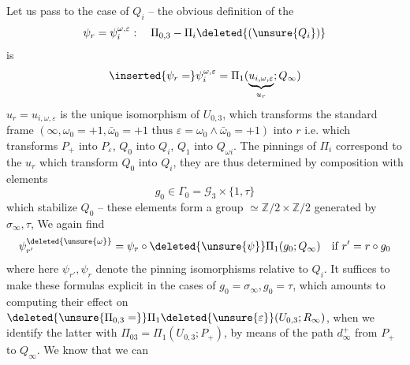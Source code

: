 Let us pass to the case of $Q_i$ -- the obvious  definition of the
\[
\psi_r=\psi_i^{\omega,\varepsilon}:\quad\Pi_{0,3}-\Pi_i\deleted{(\unsure{Q_i})}
\]
is
\[
\inserted{\psi_r=}\psi_i^{\omega,\varepsilon}=\Pi_1(\underbrace{u_{i,\omega,\varepsilon}}_{u_r};Q_\infty)
\]
 $u_r=u_{i,\omega,\varepsilon}$ is the unique isomorphism of $U_{0,3}$,  which transforms the  standard frame $(\infty,\omega_0=+1,\bar\omega_0=+1\text{ thus }\varepsilon=\omega_0\wedge\bar\omega_0=+1)$ into $r$ i.e. which transforms $P_+$ into $P_\varepsilon$, $Q_0$ into $Q_i$, $Q_1$ into $Q_{\omega i}$.  The pinnings   of $\Pi_i$ correspond to the $u_r$ which transform $Q_0$ into $Q_i$, they are thus determined by composition with elements
\[
g_0\in\Gamma_0=\mathcal G_3\times\{1,\tau\}
\]
which stabilize $Q_0$ -- these elements  form a group $\simeq\mathbb Z/2\times\mathbb Z/2$ generated by $\sigma_\infty,\tau$,  We again find
\[
\psi_{r'}^{\deleted{\unsure{\omega}}}=\psi_r\circ\deleted{\unsure{\psi}}\Pi_1(g_0;Q_\infty)\quad\text{if }r'=r\circ g_0
\]
where here $\psi_{r'},\psi_r$ denote the pinning isomorphisms relative to $Q_i$. It suffices to make these formulas explicit in the cases of $g_0=\sigma_\infty,g_0=\tau$, which amounts to computing their effect on $\deleted{\unsure{\Pi_{0,3}=}}\Pi_1\deleted{\unsure{\varepsilon}}(U_{0,3};R_\infty)$, when we identify the latter with $\Pi_{03}=\Pi_1(U_{0,3};P_+)$, by means of the path $d_\infty^+$ from $P_+$ to $Q_\infty$. We know that we can
